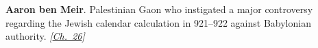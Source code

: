 \textbf{Aaron ben Meir}. Palestinian Gaon who instigated a major controversy regarding the Jewish calendar calculation in 921–922 against Babylonian authority. \emph{[\hyperref[ch:jewishcalendar]{Ch.~26}]}

